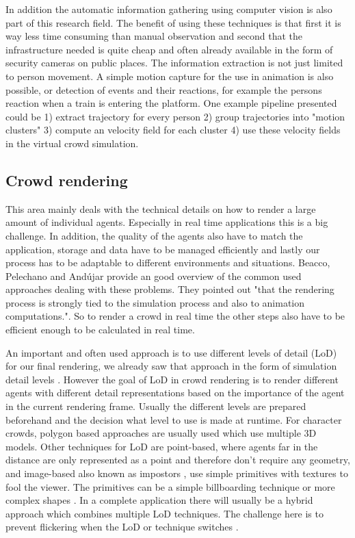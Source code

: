 \documentclass{acmsiggraph}               %
\begin{document}
In addition the automatic information gathering using computer vision is also part of this research field. The benefit of using these techniques is that first it is way less time consuming than manual observation and second that the infrastructure needed is quite cheap and often already available in the form of security cameras on public places. The information extraction is not just limited to person movement. A simple motion capture for the use in animation is also possible, or detection of events and their reactions, for example the persons reaction when a train is entering the platform. One example pipeline \cite{thalmann_crowd_2013} presented could be 1) extract trajectory for every person 2) group trajectories into "motion clusters" 3) compute an velocity field for each cluster 4) use these velocity fields in the virtual crowd simulation. 

\subsection{Crowd rendering}

This area mainly deals with the technical details on how to render a large amount of individual agents. Especially in real time applications this is a big challenge. In addition, the quality of the agents also have to match the application, storage and data have to be managed efficiently and lastly our process has to be adaptable to different environments and situations. 
Beacco, Pelechano and Andújar  provide an good overview of the common used approaches dealing with these problems. They pointed out "that the rendering process is strongly tied to the simulation process and also to animation computations.". So to render a crowd in real time the other steps also have to be efficient enough to be calculated in real time.  

An important and often used approach is to use different levels of detail (LoD) for our final rendering, we already saw that approach in the form of simulation detail levels \cite{osullivan_levels_2002}. However the goal of LoD in crowd rendering is to render different agents with different detail representations based on the importance of the agent in the current rendering frame. Usually the different levels are prepared beforehand and the decision what level to use is made at runtime. For character crowds, polygon based approaches are usually used which use multiple 3D models. Other techniques for LoD are point-based, where agents far in the distance are only represented as a point and therefore don't require any geometry, and image-based also known as impostors \cite{aubel_real-time_2000}, use simple primitives with textures to fool the viewer. The primitives can be a simple billboarding technique or more complex shapes \cite{de_heras_ciechomski_real-time_2005}. In a complete application there will usually be a hybrid approach which combines multiple LoD techniques. The challenge here is to prevent flickering when the LoD or technique switches \cite{luebke_level_2003}. 
\end{document}

